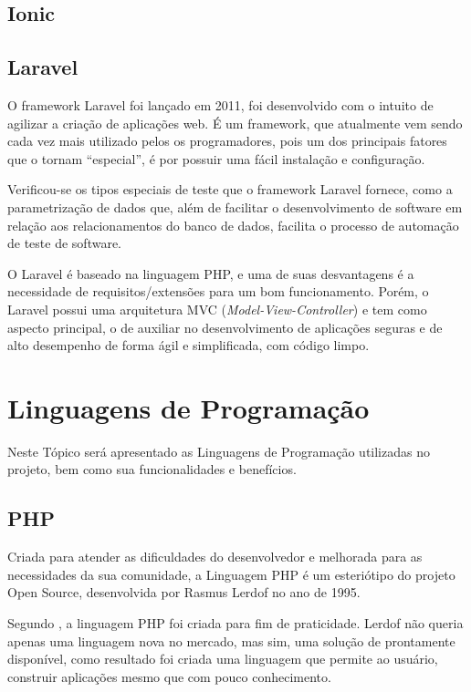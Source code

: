 \subsection{Ionic}



\subsection{Laravel}

O framework Laravel foi lançado em 2011, foi desenvolvido com o intuito de agilizar a criação de aplicações web. É um framework, que atualmente vem sendo cada vez mais utilizado pelos os programadores, pois um dos principais fatores que o tornam “especial”, é por possuir uma fácil instalação e configuração. 

\begin{citacao}
	Verificou-se os tipos especiais de teste que o framework Laravel fornece, como a parametrização de dados que, além de facilitar o desenvolvimento de software em relação aos relacionamentos do banco de dados, facilita o processo de automação de teste de software.\cite{pelizza2018estudo}
\end{citacao}


O Laravel é baseado na linguagem PHP, e uma de suas desvantagens é a necessidade de requisitos/extensões para um bom funcionamento. Porém, o Laravel possui uma arquitetura MVC (\textit{Model-View-Controller}) e tem como aspecto principal, o de auxiliar no desenvolvimento de aplicações seguras e de alto desempenho de forma ágil e simplificada, com código limpo.\cite{pelizza2018estudo}

\section{Linguagens de Programação}	

Neste Tópico será apresentado as Linguagens de Programação utilizadas no projeto, bem como sua funcionalidades e benefícios.

\subsection{PHP}

Criada para atender as dificuldades do desenvolvedor e melhorada para as necessidades da sua comunidade, a Linguagem PHP é um esteriótipo do projeto Open Source, desenvolvida por Rasmus Lerdof no ano de 1995.

Segundo , a linguagem PHP foi criada para fim de praticidade. Lerdof não queria apenas uma linguagem nova no mercado, mas sim, uma solução de prontamente disponível, como resultado foi criada uma linguagem que permite ao usuário, construir aplicações mesmo que com pouco conhecimento.

